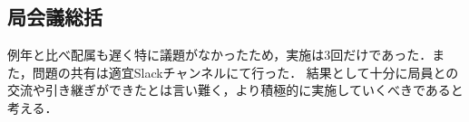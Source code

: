 \subsection*{局会議総括}


例年と比べ配属も遅く特に議題がなかったため，実施は3回だけであった．また，問題の共有は適宜Slackチャンネルにて行った．
結果として十分に局員との交流や引き継ぎができたとは言い難く，より積極的に実施していくべきであると考える．
